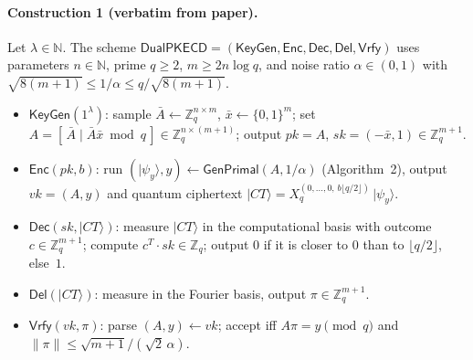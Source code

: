 \documentclass[11pt]{article}
\begin{document}
\paragraph{Construction 1 (verbatim from paper).}
Let $\lambda \in \mathbb{N}$. The scheme
$\mathsf{DualPKECD} = (\mathsf{KeyGen},\mathsf{Enc},\mathsf{Dec},\mathsf{Del},\mathsf{Vrfy})$
uses parameters $n \in \mathbb{N}$, prime $q \ge 2$, $m \ge 2n\log q$, and
noise ratio $\alpha \in (0,1)$ with
$\sqrt{8(m{+}1)} \le 1/\alpha \le q/\sqrt{8(m{+}1)}$.

\begin{itemize}
  \item $\mathsf{KeyGen}(1^\lambda)$: sample
        $\bar A \gets \mathbb{Z}_q^{n\times m}$, $\bar x \gets \{0,1\}^m$;
        set $A = [\,\bar A \mid \bar A\bar x \bmod q\,] \in \mathbb{Z}_q^{n\times(m+1)}$;
        output $pk=A$, $sk=(-\bar x, 1) \in \mathbb{Z}_q^{m+1}$.
  \item $\mathsf{Enc}(pk, b)$: run $(\lvert\psi_y\rangle, y) \gets \mathsf{GenPrimal}(A, 1/\alpha)$ (Algorithm~2), output
        $vk = (A, y)$ and quantum ciphertext
        $\lvert CT\rangle = X_q^{(0,\ldots,0,\, b\lfloor q/2\rfloor)}\, \lvert\psi_y\rangle$.
  \item $\mathsf{Dec}(sk, \lvert CT\rangle)$: measure $\lvert CT\rangle$ in
        the computational basis with outcome $c \in \mathbb{Z}_q^{m+1}$;
        compute $c^T \cdot sk \in \mathbb{Z}_q$; output $0$ if it is
        closer to $0$ than to $\lfloor q/2 \rfloor$, else~$1$.
  \item $\mathsf{Del}(\lvert CT\rangle)$: measure in the Fourier basis,
        output $\pi \in \mathbb{Z}_q^{m+1}$.
  \item $\mathsf{Vrfy}(vk,\pi)$: parse $(A,y)\gets vk$; accept iff
        $A\pi = y \pmod q$ and $\|\pi\| \le \sqrt{m{+}1}/(\sqrt 2\,\alpha)$.
\end{itemize}
\end{document}
